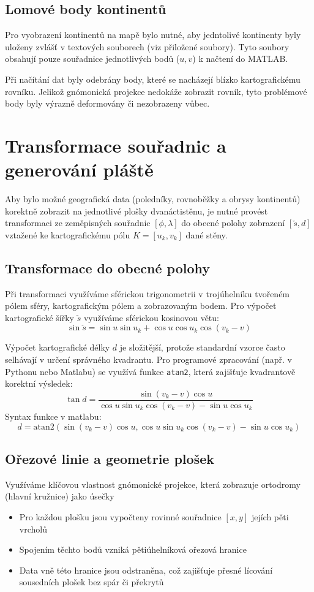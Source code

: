 \documentclass[12pt, a4paper]{article}
\begin{document}
\subsection{Lomové body kontinentů}
Pro vyobrazení kontinentů na mapě bylo nutné, aby jedntolivé kontinenty byly uloženy zvlášť v textových souborech (viz přiložené soubory). Tyto soubory obsahují pouze souřadnice jednotlivých bodů ($u,v$) k načtení do MATLAB.

Při načítání dat byly odebrány body, které se nacházejí blízko kartografickému rovníku. Jelikož gnómonická projekce nedokáže zobrazit rovník, tyto problémové body byly výrazně deformovány či nezobrazeny vůbec.

\section{Transformace souřadnic a generování pláště}

Aby bylo možné geografická data (poledníky, rovnoběžky a obrysy kontinentů) korektně zobrazit na jednotlivé plošky dvanáctistěnu, je nutné provést transformaci ze zeměpisných souřadnic $[\phi, \lambda]$ do obecné polohy zobrazení $[\check{s}, d]$ vztažené ke kartografickému pólu $K = [u_k, v_k]$ dané stěny.

\subsection{Transformace do obecné polohy}
Při transformaci využíváme sférickou trigonometrii v trojúhelníku tvořeném pólem sféry, kartografickým pólem a zobrazovaným bodem. Pro výpočet kartografické šířky $\check{s}$ využíváme sférickou kosinovou větu:
\[ \sin \check{s} = \sin u \sin u_k + \cos u \cos u_k \cos(v_k - v) \]

Výpočet kartografické délky $d$ je složitější, protože standardní vzorce často selhávají v určení správného kvadrantu. Pro programové zpracování (např. v Pythonu nebo Matlabu) se využívá funkce \texttt{atan2}, která zajišťuje kvadrantově korektní výsledek:
\[\tan d = \frac{\sin(v_k - v) \cos u}{\cos u \sin u_k \cos(v_k - v) - \sin u \cos u_k}\]
Syntax funkce v matlabu:
\[ d = \text{atan2}\left(\sin(v_k - v) \cos u, \cos u \sin u_k \cos(v_k - v) - \sin u \cos u_k\right) \]


\subsection{Ořezové linie a geometrie plošek}
Využíváme klíčovou vlastnost gnómonické projekce, která zobrazuje ortodromy (hlavní kružnice) jako úsečky  
\begin{itemize}
    \item Pro každou plošku jsou vypočteny rovinné souřadnice $[x, y]$ jejích pěti vrcholů 
    \item Spojením těchto bodů vzniká pětiúhelníková ořezová hranice
    \item Data vně této hranice jsou odstraněna, což zajišťuje přesné lícování sousedních plošek bez spár či překrytů 
\end{itemize}
\end{document}
